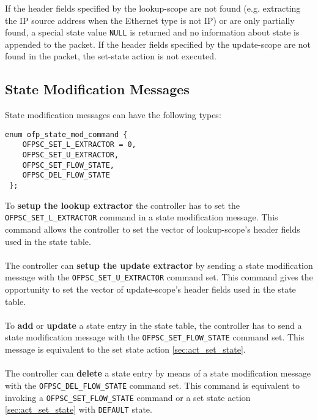 If the header fields specified by the lookup-scope are not found (e.g. extracting the IP source address when the Ethernet type is not IP) or are only partially found, a special state value \texttt{NULL} is returned and no information about state is appended to the packet.
If the header fields specified by the update-scope are not found in the packet, the set-state action is not executed.

\subsection{State Modification Messages}

\label{sec:msg_set_state}

State modification messages can have the following types:
\scriptsize\begin{verbatim}
enum ofp_state_mod_command {
    OFPSC_SET_L_EXTRACTOR = 0,
    OFPSC_SET_U_EXTRACTOR,
    OFPSC_SET_FLOW_STATE,   
    OFPSC_DEL_FLOW_STATE
 };
\end{verbatim}\normalsize



\noindent
To \textbf{setup the lookup extractor} the controller has to set the \texttt{OFPSC\_SET\_L\_EXTRACTOR} command in a state modification message. 
This command allows the controller to set the vector of lookup-scope's header fields used in the state table.
\\\\The controller can \textbf{setup the update extractor} by sending a state modification message with the \texttt{OFPSC\_SET\_U\_EXTRACTOR} command set.
This command gives the opportunity to set the vector of update-scope's header fields used in the state table.
\\\\To \textbf{add} or \textbf{update} a state entry in the state table, the controller has to send a state modification message with the \texttt{OFPSC\_SET\_FLOW\_STATE} command set. This message is equivalent to the set state action \ref{sec:act_set_state}.
\\\\The controller can \textbf{delete} a state entry by means of a state modification message with the \texttt{OFPSC\_DEL\_FLOW\_STATE} command set. This command is equivalent to invoking a \texttt{OFPSC\_SET\_FLOW\_STATE} command or a set state action \ref{sec:act_set_state} with \texttt{DEFAULT} state.

